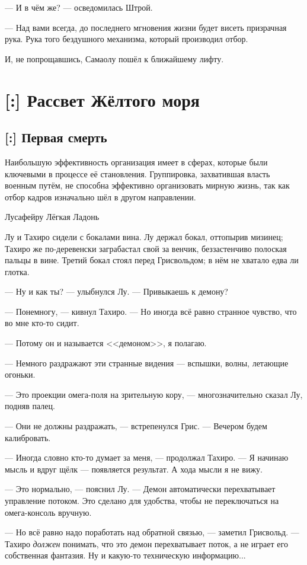 --- И в чём же? --- осведомилась Штрой.

--- Над вами всегда, до последнего мгновения жизни будет висеть призрачная рука.
Рука того бездушного механизма, который производил отбор.

И, не попрощавшись, Самаолу пошёл к ближайшему лифту.

\chapter{[:] Рассвет Жёлтого моря}

\section{[:] Первая смерть}

\epigraph
{Наибольшую эффективность организация имеет в сферах, которые были ключевыми в процессе её становления.
Группировка, захватившая власть военным путём, не способна эффективно организовать мирную жизнь, так как отбор кадров изначально шёл в другом направлении.}
{Лусафейру Лёгкая Ладонь}

Лу и Тахиро сидели с бокалами вина.
Лу держал бокал, оттопырив мизинец; Тахиро же по-деревенски заграбастал свой за венчик, беззастенчиво полоская пальцы в вине.
Третий бокал стоял перед Грисвольдом;
в нём не хватало едва ли глотка.

--- Ну и как ты? --- улыбнулся Лу.
--- Привыкаешь к демону?

--- Понемногу, --- кивнул Тахиро.
--- Но иногда всё равно странное чувство, что во мне кто-то сидит.

--- Потому он и называется <<демоном>>, я полагаю.

--- Немного раздражают эти странные видения --- вспышки, волны, летающие огоньки.

--- Это проекции омега-поля на зрительную кору, --- многозначительно сказал Лу, подняв палец.

--- Они не должны раздражать, --- встрепенулся Грис.
--- Вечером будем калибровать.

--- Иногда словно кто-то думает за меня, --- продолжал Тахиро.
--- Я начинаю мысль и вдруг щёлк --- появляется результат.
А хода мысли я не вижу.

--- Это нормально, --- пояснил Лу.
--- Демон автоматически перехватывает управление потоком.
Это сделано для удобства, чтобы не переключаться на омега-консоль вручную.

--- Но всё равно надо поработать над обратной связью, --- заметил Грисвольд.
--- Тахиро \emph{должен} понимать, что это демон перехватывает поток, а не играет его собственная фантазия.
Ну и какую-то техническую информацию...

